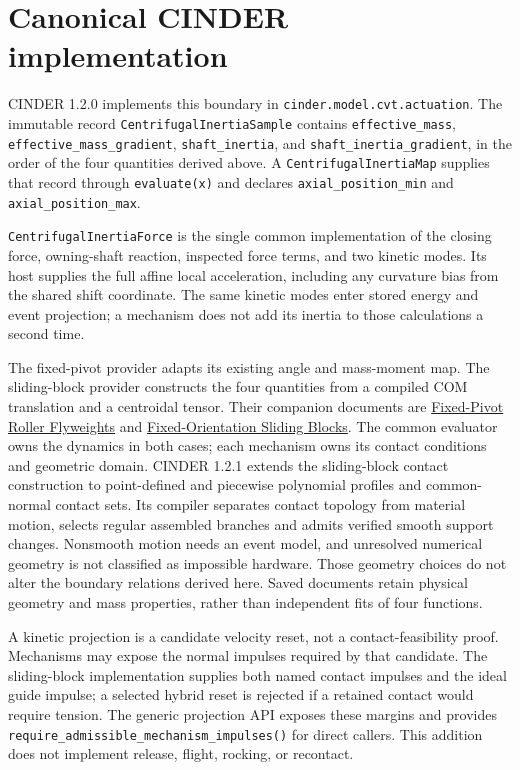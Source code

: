 \documentclass[11pt,letterpaper]{article}
\numberwithin{equation}{section}
\begin{document}
\clearpage
\section{Canonical CINDER implementation}
\label{sec:canonical}

CINDER 1.2.0 implements this boundary in
\texttt{cinder.model.cvt.actuation}. The immutable record
\texttt{CentrifugalInertiaSample} contains \texttt{effective\_mass},
\texttt{effective\_mass\_gradient}, \texttt{shaft\_inertia}, and
\texttt{shaft\_inertia\_gradient}, in the order of the four quantities derived
above. A \texttt{CentrifugalInertiaMap} supplies that record through
\texttt{evaluate(x)} and declares \texttt{axial\_position\_min} and
\texttt{axial\_position\_max}.

\texttt{CentrifugalInertiaForce} is the single common implementation of the
closing force, owning-shaft reaction, inspected force terms, and two kinetic
modes. Its host supplies the full affine local acceleration, including any
curvature bias from the shared shift coordinate. The same kinetic modes enter
stored energy and event projection; a mechanism does not add its inertia to
those calculations a second time.

The fixed-pivot provider adapts its existing angle and mass-moment map. The
sliding-block provider constructs the four quantities from a compiled COM
translation and a centroidal tensor. Their companion documents are
\href{../fixed_pivot/formulation.pdf}{Fixed-Pivot Roller Flyweights} and
\href{../sliding_block/formulation.pdf}{Fixed-Orientation Sliding Blocks}.
The common evaluator owns the dynamics in both cases; each mechanism owns its
contact conditions and geometric domain. CINDER 1.2.1 extends the sliding-block
contact construction to point-defined and piecewise polynomial profiles and
common-normal contact sets. Its compiler separates contact topology from
material motion, selects regular assembled branches and admits verified smooth
support changes. Nonsmooth motion needs an event model, and unresolved
numerical geometry is not classified as impossible hardware.
Those geometry choices do not alter the boundary
relations derived here. Saved documents retain physical
geometry and mass properties, rather than independent fits of four functions.

A kinetic projection is a candidate velocity reset, not a contact-feasibility
proof. Mechanisms may expose the normal impulses required by that candidate.
The sliding-block implementation supplies both named contact impulses and the
ideal guide impulse; a selected hybrid reset is rejected if a retained contact
would require tension. The generic projection API exposes these margins and
provides \texttt{require\_admissible\_mechanism\_impulses()} for direct callers.
This addition does not implement release, flight, rocking, or recontact.
\end{document}
